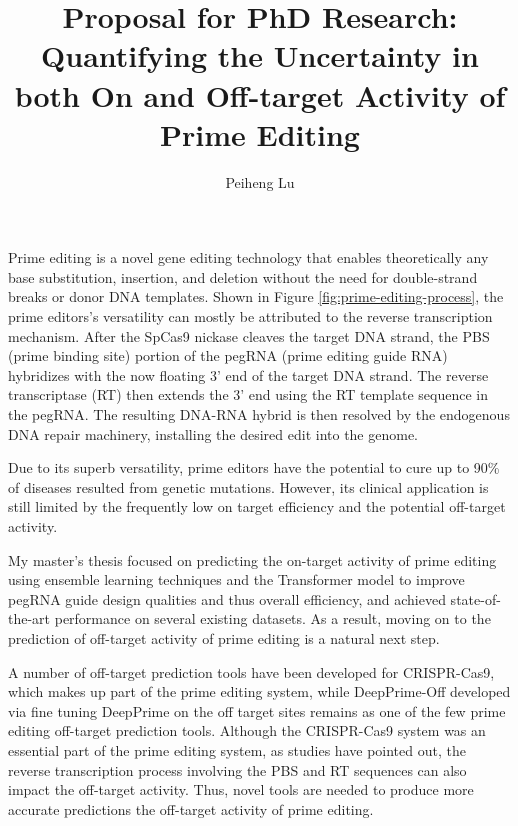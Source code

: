 \documentclass[a4,12pt]{article}
\title{Proposal for PhD Research: 
Quantifying the Uncertainty in both On and Off-target Activity of Prime Editing}
\author{Peiheng Lu}
\begin{document}
\maketitle

Prime editing is a novel gene editing technology that enables theoretically any base substitution, insertion, and deletion without the need for double-strand breaks or donor DNA templates\cite{liudavidr.SearchreplaceGenomeEditing2019,liuPrimeEditingPrecise2023}. Shown in Figure \ref{fig:prime-editing-process}, the prime editors's versatility can mostly be attributed to the reverse transcription mechanism. After the SpCas9 nickase cleaves the target DNA strand, the PBS (prime binding site) portion of the pegRNA (prime editing guide RNA) hybridizes with the now floating 3' end of the target DNA strand. The reverse transcriptase (RT) then extends the 3' end using the RT template sequence in the pegRNA. The resulting DNA-RNA hybrid is then resolved by the endogenous DNA repair machinery, installing the desired edit into the genome.

Due to its superb versatility, prime editors have the potential to cure up to 90\% of diseases resulted from genetic mutations\cite{kantorCRISPRCas9DNABaseEditing2020}. However, its clinical application is still limited by the frequently low on target efficiency and the potential off-target activity\cite{zhaoPrimeEditingAdvances2023}.

My master's thesis focused on predicting the on-target activity of prime editing using ensemble learning techniques and the Transformer model to improve pegRNA guide design qualities and thus overall efficiency, and achieved state-of-the-art performance on several existing datasets. As a result, moving on to the prediction of off-target activity of prime editing is a natural next step.

A number of off-target prediction tools have been developed for CRISPR-Cas9, which makes up part of the prime editing system, while DeepPrime-Off developed via fine tuning DeepPrime on the off target sites remains as one of the few prime editing off-target prediction tools. Although the CRISPR-Cas9 system was an essential part of the prime editing system, as studies have pointed out, the reverse transcription process involving the PBS and RT sequences can also impact the off-target activity. Thus, novel tools are needed to produce more accurate predictions the off-target activity of prime editing\parencite{liangGenomewideProfilingPrime2023,yuPredictionEfficienciesDiverse2023}.
\end{document}
